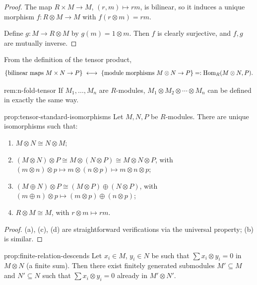 \begin{proof}
The map $R\times M \to M$, $(r,m)\mapsto rm$, is bilinear, so it induces a unique morphism $f: R\otimes M \to M$ with $f(r\otimes m) = rm$.

Define $g: M \to R\otimes M$ by $g(m) = 1\otimes m$. Then $f$ is clearly surjective, and $f,g$ are mutually inverse.
\end{proof}

From the definition of the tensor product,
\[
\{\text{bilinear maps } M\times N \to P\} \ \longleftrightarrow\ \{\text{module morphisms } M\otimes N \to P\} =: \Hom_R(M\otimes N, P).
\]

\begin{remark}{}{rem:n-fold-tensor}
If $M_1,\ldots,M_n$ are $R$-modules, $M_1\otimes M_2\otimes\cdots\otimes M_n$ can be defined in exactly the same way.
\end{remark}

\begin{proposition}{}{prop:tensor-standard-isomorphisms}
Let $M,N,P$ be $R$-modules. There are unique isomorphisms such that:
\begin{enumerate}[label=(\alph*)]
    \item $M\otimes N \cong N\otimes M$;
    \item $(M\otimes N)\otimes P \cong M\otimes(N\otimes P) \cong M\otimes N\otimes P$, with $(m\otimes n)\otimes p \mapsto m\otimes(n\otimes p) \mapsto m\otimes n\otimes p$;
    \item $(M\oplus N)\otimes P \cong (M\otimes P)\oplus(N\otimes P)$, with $(m\oplus n)\otimes p \mapsto (m\otimes p)\oplus(n\otimes p)$;
    \item $R\otimes M \cong M$, with $r\otimes m \mapsto rm$.
\end{enumerate}
\end{proposition}

\begin{proof}
(a), (c), (d) are straightforward verifications via the universal property; (b) is similar.
\end{proof}

\begin{proposition}{}{prop:finite-relation-descends}
Let $x_i \in M$, $y_i \in N$ be such that $\sum x_i \otimes y_i = 0$ in $M\otimes N$ (a finite sum). Then there exist finitely generated submodules $M' \subseteq M$ and $N' \subseteq N$ such that $\sum x_i\otimes y_i = 0$ already in $M'\otimes N'$.
\end{proposition}

